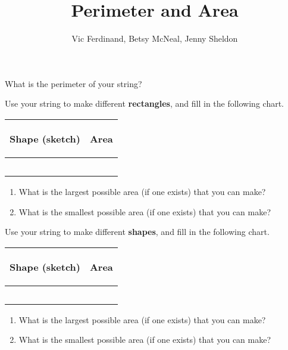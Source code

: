 \documentclass{ximera}
\title{Perimeter and Area}
\author{Vic Ferdinand, Betsy McNeal, Jenny Sheldon}
\begin{document}
\begin{abstract}\end{abstract}
\maketitle



\begin{problem}
What is the perimeter of your string?  \end{problem}

\begin{problem} Use your string to make different {\bf rectangles}, and fill in the following chart.
\vskip 0.1in
\begin{tabular}{|p{2.2in}|p{2.2in}|}
\hline
\begin{center} Shape (sketch) \end{center} & \begin{center} Area \end{center}  \\ \hline
 & \\ [10ex] \hline
 & \\ [10 ex] \hline
 & \\ [10 ex] \hline
 & \\ [10 ex] \hline
 & \\ [10 ex] \hline
\end{tabular}
\begin{enumerate}

\item What is the largest possible area (if one exists) that you can make?
\item What is the smallest possible area (if one exists) that you can make?
\end{enumerate}

\end{problem}
\newpage
\begin{problem} Use your string to make different {\bf shapes}, and fill in the following chart.
\vskip 0.1in
\begin{tabular}{|p{2.2in}|p{2.2in}|}
\hline
\begin{center} Shape (sketch) \end{center} & \begin{center} Area \end{center}  \\ \hline
 & \\ [10ex] \hline
 & \\ [10 ex] \hline
 & \\ [10 ex] \hline
 & \\ [10 ex] \hline
 & \\ [10 ex] \hline
\end{tabular}

\begin{enumerate}

\item What is the largest possible area (if one exists) that you can make?
\item What is the smallest possible area (if one exists) that you can make?
\end{enumerate}
\end{problem}
\end{document}
